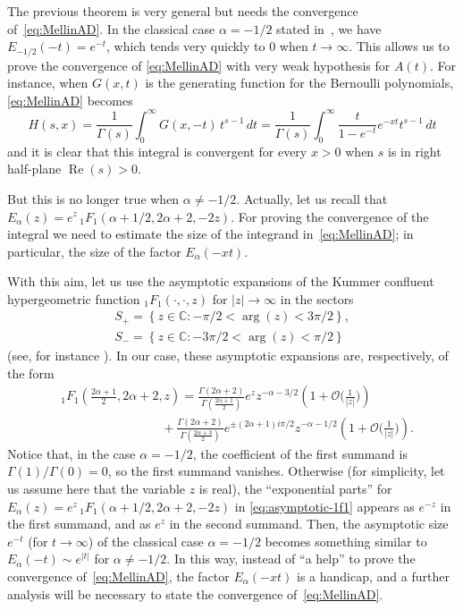 \documentclass[a4paper]{amsart}
\newcommand{\C}{\mathbb{C}}
\newcommand{\Ea}{E_{\alpha}}
\newcommand{\calO}{\mathcal{O}}
\renewcommand{\Re}{\operatorname{Re}}
\theoremstyle{plain}
\theoremstyle{definition}
\theoremstyle{remark}
\numberwithin{equation}{section}
\begin{document}
The previous theorem is very general but needs the convergence of~\eqref{eq:MellinAD}. In the classical case $\alpha=-1/2$ stated in~\cite{NRV-2018}, we have $E_{-1/2}(-t) = e^{-t}$, which tends very quickly to $0$ when $t\to\infty$. This allows us to prove the convergence of 
\eqref{eq:MellinAD} with very weak hypothesis for $A(t)$. 
For instance, when $G(x,t)$ is the generating function for the Bernoulli polynomials,
\eqref{eq:MellinAD} becomes
\[
   H(s,x) = \frac{1}{\Gamma(s)} \int_{0}^{\infty} G(x,-t)\,t^{s-1}\,dt 
         = \frac{1}{\Gamma(s)} \int_{0}^{\infty} \frac{t}{1-e^{-t}} e^{-xt} t^{s-1}\,dt
\]
and it is clear that this integral is convergent for every $x>0$ when $s$ is in right half-plane $\Re(s) > 0$.

But this is no longer true when $\alpha \ne -1/2$.
Actually, let us recall that $\Ea(z) = e^{z} \, {}_1F_1(\alpha+1/2,2\alpha+2,-2z)$.
For proving the convergence of the integral we need to estimate the size of the integrand in~\eqref{eq:MellinAD}; in particular, the size of the factor $\Ea(-xt)$.

With this aim, let us use the asymptotic expansions of the Kummer confluent hypergeometric function ${}_1F_1(\cdot , \cdot , z)$ for $|z| \to \infty$ in the sectors
\begin{gather*}
S_+ = \left\lbrace z \in \C: -\pi/2 < \arg(z) < 3\pi/2 \right\rbrace , \\
S_- = \left\lbrace z \in \C: -3\pi/2 < \arg(z) < \pi/2 \right\rbrace 
\end{gather*}
(see, for instance \cite[p.~128]{Rosler-LN}).
In our case, these asymptotic expansions are, respectively, of the form
\begin{equation}
\label{eq:asymptotic-1f1}
\begin{aligned}
& {}_1F_1\left(\frac{2\alpha+1}{2},2\alpha+2,z\right) 
= \frac{\Gamma(2\alpha+2)}{\Gamma(\frac{2\alpha+1}{2})}e^z z^{-\alpha-3/2} 
\left( 1 + \calO\Big(\frac{1}{|z|}\Big)\right) \\
&\qquad\qquad\qquad\qquad 
+ \frac{\Gamma(2\alpha+2)}{\Gamma(\frac{2\alpha+3}{2})} e^{\pm{(2\alpha+1)i\pi}/{2}} 
z^{-\alpha-1/2} \left( 1 + \calO\Big(\frac{1}{|z|}\Big)\right) .
\end{aligned}
\end{equation}
Notice that, in the case $\alpha=-1/2$, the coefficient of the first summand is $\Gamma(1)/\Gamma(0) = 0$, so the first summand vanishes. Otherwise (for simplicity, let us assume here that the variable $z$ is real), the ``exponential parts'' for $\Ea(z) = e^{z} \, {}_1F_1(\alpha+1/2,2\alpha+2,-2z)$ in \eqref{eq:asymptotic-1f1} appears as $e^{-z}$ in the first summand, and as $e^{z}$ in the second summand. Then, the asymptotic size $e^{-t}$ (for $t\to\infty$) of the classical case $\alpha=-1/2$ becomes something similar to $\Ea(-t) \sim e^{|t|}$ for $\alpha\ne-1/2$. In this way, instead of ``a help'' to prove the convergence of~\eqref{eq:MellinAD}, the factor $\Ea(-xt)$ is a handicap, and a further analysis will be necessary to state the convergence of~\eqref{eq:MellinAD}. 
\end{document}
